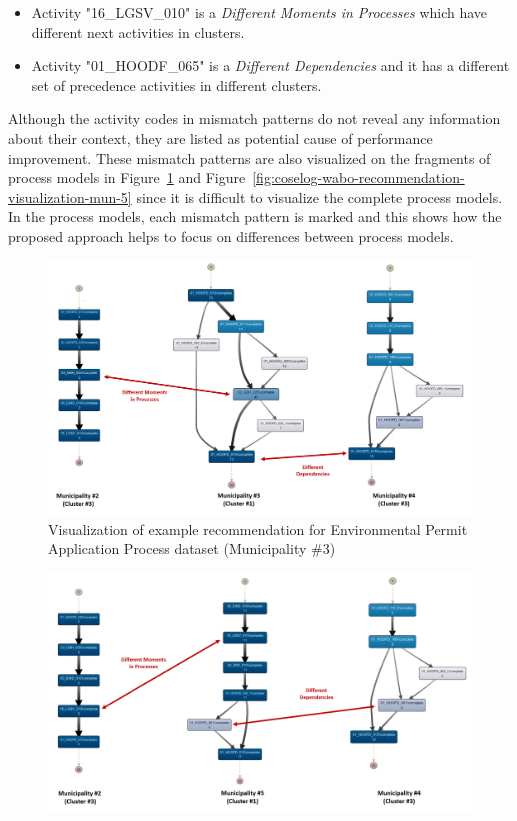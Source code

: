 \begin{itemize}
\begin{itemize}
\begin{itemize}
			\item Activity "16\_LGSV\_010" is a \textit{Different Moments in Processes} which have different next activities in clusters.
			\item Activity "01\_HOODF\_065" is a \textit{Different Dependencies} and it has a different set of precedence activities in different clusters.
 		\end{itemize}
	Although the activity codes in mismatch patterns do not reveal any information about their context, they are listed as potential cause of performance improvement. These mismatch patterns are also visualized on the fragments of process models in Figure~\ref{fig:coselog-wabo-recommendation-visualization-mun-3} and Figure~\ref{fig:coselog-wabo-recommendation-visualization-mun-5} since it is difficult to visualize the complete process models. In the process models, each mismatch pattern is marked and this shows how the proposed approach helps to focus on differences between process models.
			\begin{figure}
			\centering
			\includegraphics[width=\textwidth]{5_results_discussions/coselog-wabo/recommendation-visualization-mun-3}
			\caption{Visualization of example recommendation for Environmental Permit Application Process dataset (Municipality \#3)}
		  \label{fig:coselog-wabo-recommendation-visualization-mun-3}
		\end{figure}
				\begin{figure}
			\centering
			\includegraphics[width=\textwidth]{5_results_discussions/coselog-wabo/recommendation-visualization-mun-5}

\end{figure}
\end{itemize}
\end{itemize}
